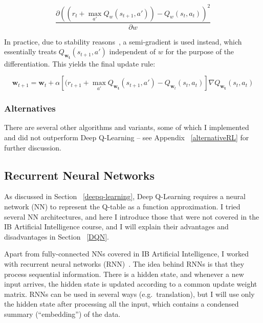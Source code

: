 $$\frac{\partial (( r_t + \max_{a'} Q_w(s_{t+1}, a')) - Q_w(s_t,a_t))^2}{\partial w}$$

In practice, due to stability reasons~\cite{barnard1993semigradient},  a semi-gradient is used instead, which essentially treats $Q_{\mathbf{w_t}}(s_{t+1}, a')$ independent of $w$ for the purpose of the differentiation. This yields the final update rule:


\begin{equation} \label{eq:deep-q-learning-update-with-semi-gradient}
\mathbf{w}_{t+1} = \mathbf{w}_t + \alpha[( r_{t+1}+ \max_{a'} Q_{\mathbf{w_t}}(s_{t+1}, a') - Q_{\mathbf{w}_t}(s_t,a_t)]\nabla Q_{\mathbf{w_t}}(s_{t}, a_t)
\end{equation}

\subsubsection{Alternatives}

There are several other algorithms and variants, some of which I implemented and did not outperform Deep Q-Learning -- see Appendix ~\ref{alternativeRL} for further discussion.


\subsection{Recurrent Neural Networks} \label{RNN}


As discussed in Section ~\ref{deepq-learning}, Deep Q-Learning requires a neural network (NN) to represent the Q-table as a function approximation. I tried several NN architectures, and here I introduce those that were not covered in the IB Artificial Intelligence course, and I will explain their advantages and disadvantages in Section ~\ref{DQN}. 

Apart from fully-connected NNs covered in IB Artificial Intelligence, I worked with recurrent neural networks (RNN)~\cite{hopfield1982RNNoriginal}. The idea behind RNNs is that they process sequential information. There is a hidden state, and whenever a new input arrives, the hidden state is updated according to a common update weight matrix. RNNs can be used in several ways (e.g.\ translation), but I will use only the hidden state after processing all the input, which contains a condensed summary (``embedding'') of the data.


